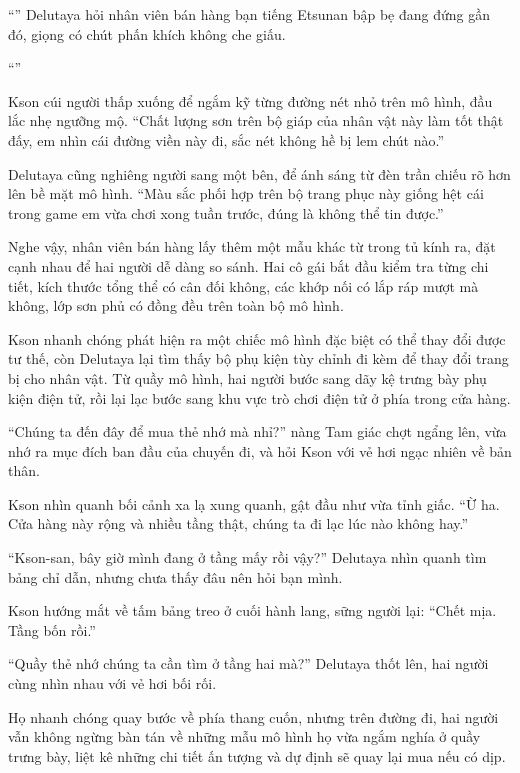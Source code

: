 ﻿\documentclass[../main.tex]{subfiles}
\begin{document}
``'' Delutaya hỏi nhân viên bán hàng bạn tiếng Etsunan bập bẹ đang đứng gần đó, giọng có chút phấn khích không che giấu.

``''

Kson cúi người thấp xuống để ngắm kỹ từng đường nét nhỏ trên mô hình, đầu lắc nhẹ ngưỡng mộ. ``Chất lượng sơn trên bộ giáp của nhân vật này làm tốt thật đấy, em nhìn cái đường viền này đi, sắc nét không hề bị lem chút nào.''

Delutaya cũng nghiêng người sang một bên, để ánh sáng từ đèn trần chiếu rõ hơn lên bề mặt mô hình. ``Màu sắc phối hợp trên bộ trang phục này giống hệt cái trong game em vừa chơi xong tuần trước, đúng là không thể tin được.''

Nghe vậy, nhân viên bán hàng lấy thêm một mẫu khác từ trong tủ kính ra, đặt cạnh nhau để hai người dễ dàng so sánh. Hai cô gái bắt đầu kiểm tra từng chi tiết, kích thước tổng thể có cân đối không, các khớp nối có lắp ráp mượt mà không, lớp sơn phủ có đồng đều trên toàn bộ mô hình.

Kson nhanh chóng phát hiện ra một chiếc mô hình đặc biệt có thể thay đổi được tư thế, còn Delutaya lại tìm thấy bộ phụ kiện tùy chỉnh đi kèm để thay đổi trang bị cho nhân vật. Từ quầy mô hình, hai người bước sang dãy kệ trưng bày phụ kiện điện tử, rồi lại lạc bước sang khu vực trò chơi điện tử ở phía trong cửa hàng.

``Chúng ta đến đây để mua thẻ nhớ mà nhỉ?'' nàng Tam giác chợt ngẩng lên, vừa nhớ ra mục đích ban đầu của chuyến đi, và hỏi Kson với vẻ hơi ngạc nhiên về bản thân.

Kson nhìn quanh bối cảnh xa lạ xung quanh, gật đầu như vừa tỉnh giấc. ``Ừ ha. Cửa hàng này rộng và nhiều tầng thật, chúng ta đi lạc lúc nào không hay.''

``Kson-san, bây giờ mình đang ở tầng mấy rồi vậy?'' Delutaya nhìn quanh tìm bảng chỉ dẫn, nhưng chưa thấy đâu nên hỏi bạn mình.

Kson hướng mắt về tấm bảng treo ở cuối hành lang, sững người lại: ``Chết mịa. Tầng bốn rồi.''

``Quầy thẻ nhớ chúng ta cần tìm ở tầng hai mà?'' Delutaya thốt lên, hai người cùng nhìn nhau với vẻ hơi bối rối.

Họ nhanh chóng quay bước về phía thang cuốn, nhưng trên đường đi, hai người vẫn không ngừng bàn tán về những mẫu mô hình họ vừa ngắm nghía ở quầy trưng bày, liệt kê những chi tiết ấn tượng và dự định sẽ quay lại mua nếu có dịp.
\end{document}
